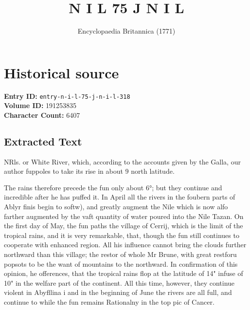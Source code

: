 \documentclass{article}
\title{N I L 75 J N I L}
\date{Encyclopaedia Britannica (1771)}
\begin{document}
\maketitle

\section*{Historical source}
\textbf{Entry ID:} \texttt{entry-n-i-l-75-j-n-i-l-318} \\
\textbf{Volume ID:} 191253835 \\
\textbf{Character Count:} 6407

\subsection*{Extracted Text}
NRls. or White River, which, according to the accounts given by the Galla, our author fuppoles to take its rise in about 9 north latitude.

The rains therefore precede the fun only about 6°; but they continue and incredible after he has puffed it. In April all the rivers in the foubern parts of Ablyr finis begin to softw), and greatly augment the Nile which is now alfo farther augmented by the vaft quantity of water poured into the Nile Tazan. On the first day of May, the fun paths the village of Cerrij, which is the limit of the tropical rains, and it is very remarkable, that, though the fun still continues to cooperate with enhanced region. All his influence cannot bring the clouds further northward than this village; the restor of whole Mr Brune, with great restforu popsots to be the want of mountains to the northward. In confirmation of this opinion, he offerences, that the tropical rains flop at the latitude of 14" infuse of 10" in the welfare part of the continent. All this time, however, they continue violent in Abyfllina i and in the beginning of June the rivers are all full, and continue to while the fun remains Rationalny in the top pic of Cancer.
\end{document}
